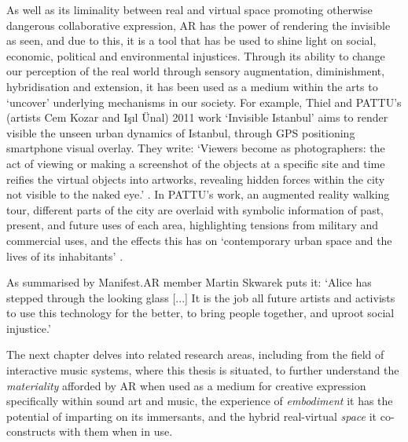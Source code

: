 As well as its liminality between real and virtual space promoting otherwise dangerous collaborative expression, AR has the power of rendering the invisible as seen, and due to this, it is a tool that has be used to shine light on social, economic, political and environmental injustices. Through its ability to change our perception of the real world through sensory augmentation, diminishment, hybridisation and extension, it has been used as a medium within the arts to `uncover' underlying mechanisms in our society. For example, Thiel and PATTU's (artists Cem Kozar and Işıl Ünal) 2011 work `Invisible Istanbul' aims to render visible the unseen urban dynamics of Istanbul, through GPS positioning smartphone visual overlay. They write: `Viewers become as photographers: the act of viewing or making a screenshot of the objects at a specific site and time reifies the virtual objects into artworks, revealing hidden forces within the city not visible to the naked eye.' \citeyearpar{thiel2011}. In PATTU's work, an augmented reality walking tour, different parts of the city are overlaid with symbolic information of past, present, and future uses of each area, highlighting tensions from military and commercial uses, and the effects this has on `contemporary urban space and the lives of its inhabitants' \citeyearpar{thiel2018}.



As summarised by Manifest.AR member Martin Skwarek puts it: `Alice has stepped through the looking glass [...] It is the job all future artists and activists to use this technology for the better, to bring people together, and uproot social injustice.' \citeyearpar{skwarek2018}

The next chapter delves into related research areas, including from the field of interactive music systems, where this thesis is situated, to further understand the \textit{materiality} afforded by AR when used as a medium for creative expression specifically within sound art and music, the experience of \textit{embodiment} it has the potential of imparting on its immersants, and the hybrid real-virtual \textit{space} it co-constructs with them when in use.

